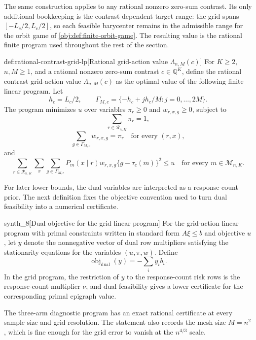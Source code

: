 The same construction applies to any rational nonzero zero-sum contrast. Its only additional bookkeeping is the contrast-dependent target range: the grid  spans \([-L_c/2,L_c/2]\), so each feasible barycenter remains in the admissible range for the orbit game of \cref{obj:def:finite-orbit-game}. The resulting value  is the rational finite program used throughout the rest of the section.

\begin{definitionv}{def:rational-contrast-grid-lp}[Rational grid-action value \(\Lambda_{n,M}(c)\)]
For \(K\geq 2\), \(n,M\geq 1\), and a rational nonzero zero-sum contrast \(c\in\mathbb Q^K\), define the rational contrast grid-action value \(\Lambda_{n,M}(c)\) as the optimal value of the following finite linear program. Let
\[
h_c=L_c/2,
\qquad
\Gamma_{M,c}=\{-h_c+jh_c/M:j=0,\ldots,2M\}.
\]
The program minimizes \(u\) over variables \(\pi_r\geq0\) and \(w_{r,x,g}\geq0\), subject to
\[
\sum_{r\in\mathcal R_{n,K}}\pi_r=1,
\]
\[
\sum_{g\in\Gamma_{M,c}}w_{r,x,g}=\pi_r
\quad\text{for every }(r,x),
\]
and
\[
\sum_{r\in\mathcal R_{n,K}}\sum_x\sum_{g\in\Gamma_{M,c}}
P_m(x\mid r)w_{r,x,g}\{g-\tau_c(m)\}^2\leq u
\quad\text{for every }m\in\mathcal M_{n,K}.
\]
\end{definitionv}

For later lower bounds, the dual variables are interpreted as a response-count prior. The next definition fixes the objective convention used to turn dual feasibility into a numerical certificate.

\begin{definitionv}{synth_8}[Dual objective for the grid linear program]
For the grid-action linear program with primal constraints written in standard form \(A\xi\le b\) and objective \(u\), let \(y\) denote the nonnegative vector of dual row multipliers satisfying the stationarity equations for the variables \((u,\pi,w)\). Define
\[
\operatorname{obj}_{\mathrm{dual}}(y)=-\sum_i y_i b_i.
\]
In the grid program, the restriction of \(y\) to the response-count risk rows is the response-count multiplier \(\nu\), and dual feasibility gives a lower certificate for the corresponding primal epigraph value.
\end{definitionv}

The three-arm diagnostic program has an exact rational certificate at every sample size and grid resolution. The statement also records the mesh size \(M=n^2\), which is fine enough for the grid error to vanish at the \(n^{4/3}\) scale.

